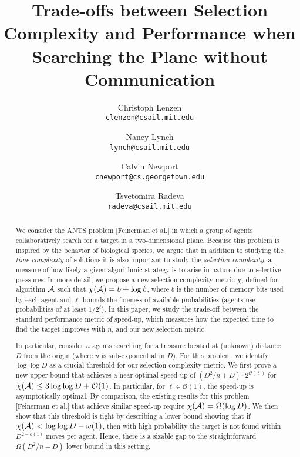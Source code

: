 \documentclass[11pt]{article}
\newcommand{\BO}{\mathcal{O}}
\begin{document}
\title{Trade-offs between Selection Complexity and Performance when Searching the Plane without Communication}
\date{}
\author{
  Christoph Lenzen\\
  \texttt{clenzen@csail.mit.edu}
  \and
  Nancy Lynch\\
  \texttt{lynch@csail.mit.edu}
  \and
  Calvin Newport\\
  \texttt{cnewport@cs.georgetown.edu}
  \and
  Tsvetomira Radeva\\
  \texttt{radeva@csail.mit.edu}
}
\maketitle

\begin{abstract}
We consider the ANTS problem [Feinerman et al.] in which a group of agents collaboratively search for a target in a two-dimensional plane. Because this problem is inspired by the behavior of biological species, we argue that in addition to studying the {\em time complexity} of solutions it is also important to study the {\em selection complexity}, a measure of how likely a given algorithmic strategy is to arise in nature due to selective pressures. In more detail, we propose a new selection complexity metric $\chi$, defined for algorithm ${\cal A}$ such that $\chi({\cal A}) = b + \log \ell$, where $b$ is the number of memory bits used by each agent and $\ell$ bounds the fineness of available probabilities (agents use probabilities of at least $1/2^\ell$). In this paper, we study the trade-off between the standard performance metric of speed-up, which measures how the expected time to find the target improves with $n$, and our new selection metric. 

In particular, consider $n$ agents searching for a treasure located at (unknown) distance $D$ from the origin (where $n$ is sub-exponential in $D$). For this problem, we identify $\log \log D$ as a crucial threshold for our selection complexity metric. We first prove a new upper bound that achieves a near-optimal speed-up of $(D^2/n +D) \cdot 2^{\BO(\ell)}$ for $\chi({\cal A}) \leq 3 \log \log D + \BO(1)$. In particular, for $\ell \in \BO(1)$, the speed-up is asymptotically optimal. By comparison, the existing results for this problem [Feinerman et al.] that achieve similar speed-up require $\chi({\cal A}) = \Omega(\log D)$. We then show that this threshold is tight by describing a lower bound showing that if $\chi({\cal A}) < \log \log D - \omega(1)$, then with high probability the target is not found within $D^{2-o(1)}$ moves per agent. Hence, there is a sizable gap to the straightforward $\Omega(D^2/n + D)$ lower bound in this setting. 


\end{abstract}
\end{document}

